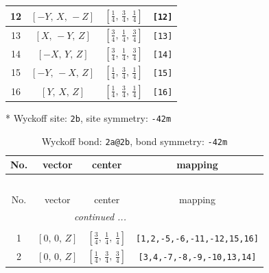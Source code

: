\documentclass[fleqn,8pt]{jsarticle}
\begin{document}
\begin{longtable}{cccc}
12 & $\left[ - Y,\, X,\, - Z \right]$ & $\left[ \frac{1}{4},\, \frac{3}{4},\, \frac{1}{4} \right]$ & {\tt [12]} \\ \hline
13 & $\left[ X,\, - Y,\, Z \right]$ & $\left[ \frac{3}{4},\, \frac{1}{4},\, \frac{3}{4} \right]$ & {\tt [13]} \\ \hline
14 & $\left[ - X,\, Y,\, Z \right]$ & $\left[ \frac{3}{4},\, \frac{1}{4},\, \frac{3}{4} \right]$ & {\tt [14]} \\ \hline
15 & $\left[ - Y,\, - X,\, Z \right]$ & $\left[ \frac{1}{4},\, \frac{3}{4},\, \frac{1}{4} \right]$ & {\tt [15]} \\ \hline
16 & $\left[ Y,\, X,\, Z \right]$ & $\left[ \frac{1}{4},\, \frac{3}{4},\, \frac{1}{4} \right]$ & {\tt [16]} \\
\end{longtable}
* Wyckoff site: {\tt 2b}, site symmetry: {\tt -42m}
\renewcommand{\arraystretch}{1.2}
\begin{longtable}{cccc}
\caption{Wyckoff bond: {\tt 2a@2b}, bond symmetry: {\tt -42m}}
 \\
 \hline \hline
No. & vector & center & mapping \\ \hline \endfirsthead

\multicolumn{3}{l}{\tablename\ \thetable{}} \\
 \hline \hline
No. & vector & center & mapping \\ \hline \endhead

 \hline \hline
\multicolumn{3}{r}{\footnotesize\it continued ...} \\ \endfoot

 \hline \hline
\multicolumn{3}{r}{} \\ \endlastfoot

1 & $\left[ 0,\, 0,\, Z \right]$ & $\left[ \frac{3}{4},\, \frac{1}{4},\, \frac{1}{4} \right]$ & {\tt [1,2,-5,-6,-11,-12,15,16]} \\ \hline
2 & $\left[ 0,\, 0,\, Z \right]$ & $\left[ \frac{1}{4},\, \frac{3}{4},\, \frac{3}{4} \right]$ & {\tt [3,4,-7,-8,-9,-10,13,14]} \\
\end{longtable}
\renewcommand{\arraystretch}{1.2}
\end{document}
